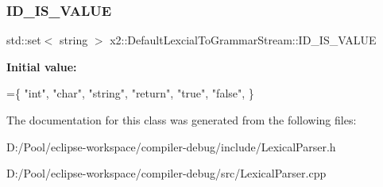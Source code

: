 \subsubsection{\texorpdfstring{I\+D\+\_\+\+I\+S\+\_\+\+V\+A\+L\+UE}{ID\_IS\_VALUE}}
{\footnotesize\ttfamily std\+::set$<$ string $>$ x2\+::\+Default\+Lexcial\+To\+Grammar\+Stream\+::\+I\+D\+\_\+\+I\+S\+\_\+\+V\+A\+L\+UE\hspace{0.3cm}{\ttfamily [static]}}

{\bfseries Initial value\+:}
\begin{DoxyCode}
=\{
                \textcolor{stringliteral}{"int"},
                \textcolor{stringliteral}{"char"},
                \textcolor{stringliteral}{"string"},
                \textcolor{stringliteral}{"return"},
                \textcolor{stringliteral}{"true"},
                \textcolor{stringliteral}{"false"},
        \}
\end{DoxyCode}


The documentation for this class was generated from the following files\+:\begin{DoxyCompactItemize}
\item 
D\+:/\+Pool/eclipse-\/workspace/compiler-\/debug/include/Lexical\+Parser.\+h\item 
D\+:/\+Pool/eclipse-\/workspace/compiler-\/debug/src/Lexical\+Parser.\+cpp\end{DoxyCompactItemize}
